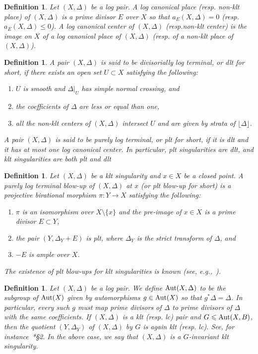 \documentclass{amsart}
\newtheorem{definition}[theorem]{Definition}
\theoremstyle{remark}
\numberwithin{equation}{section}
\begin{document}
\begin{definition}{\em 
Let $(X,\Delta)$ be a log pair.
A {\em log canonical place} (resp. {\em non-klt place}) of $(X,\Delta)$ is a prime divisor $E$ over $X$ so that $a_E(X,\Delta)=0$ (resp. $a_E(X,\Delta)\leq 0$).
A {\em log canonical center} of $(X,\Delta)$ (resp.{\em non-klt center}) is the image on $X$ of a log canonical place of $(X,\Delta)$
(resp. of a non-klt place of $(X,\Delta)$).
}
\end{definition}

\begin{definition}{\em 
A pair $(X,\Delta)$ is said to be {\em divisorially log terminal},
or {\em dlt} for short, if there exists an open set $U\subset X$ 
satisfying the following:
\begin{enumerate}
\item $U$ is smooth and $\Delta|_U$ has simple normal crossing, and
\item the coefficients of $\Delta$ are less or equal than one,
\item all the non-klt centers of $(X,\Delta)$ intersect $U$ and
are given by strata of $\lfloor \Delta\rfloor$.
\end{enumerate}
A pair $(X,\Delta)$ is said to be {\em purely log terminal},
or {\em plt} for short, if it is dlt and it has at most one log canonical center.
In particular, plt singularities are dlt, 
and klt singularities are both plt and dlt
}
\end{definition}

\begin{definition}{\em 
Let $(X,\Delta)$ be a klt singularity and $x\in X$ be a closed point.
A {\em purely log terminal blow-up} of $(X,\Delta)$ at $x$
(or {\em plt blow-up} for short)
is a projective birational morphism $\pi\colon Y\rightarrow X$ satisfying the following:
\begin{enumerate}
\item $\pi$ is an isomorphism over $X\setminus \{x\}$ and the pre-image of $x\in X$ is a prime divisor $E\subset Y$, 
\item the pair $(Y,\Delta_Y+E)$ is plt, where $\Delta_Y$ is the strict transform of $\Delta$, and
\item $-E$ is ample over $X$.
\end{enumerate}
The existence of plt blow-ups for klt singularities is known (see, e.g.,~\cites{Pro00,Xu14}).
}
\end{definition}

\begin{definition} 
{\em
Let $(X,\Delta)$ be a log pair.
We define ${\rm Aut}(X,\Delta)$ to be the subgroup 
of ${\rm Aut}(X)$ given by automorphisms $g\in {\rm Aut}(X)$ 
so that $g^* \Delta=\Delta$.
In particular, every such $g$ must map prime divisors of
$\Delta$ to prime divisors of $\Delta$ with the same coefficients.
If $(X,\Delta)$ is a klt (resp. lc) pair 
and $G\leqslant {\rm Aut}(X,B)$, then the quotient $(Y,\Delta_Y)$
of $(X,\Delta)$ by $G$ is again klt (resp. lc). 
See, for instance~\cite{Sho93}*{\S 2}.
In the above case, we say that $(X,\Delta)$ is a {\em $G$-invariant klt singularity}.
}
\end{definition}
\end{document}
